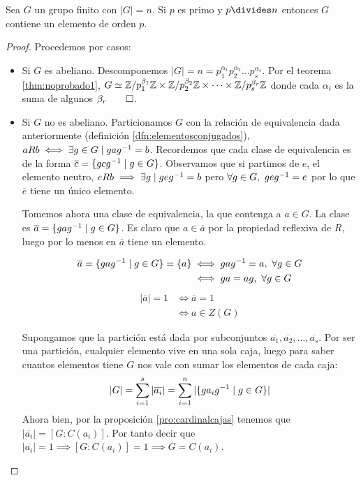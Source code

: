 \begin{thm}[de Cauchy]
	Sea $G$ un grupo finito con $|G| = n$. Si $p$ es primo y $p\divides n$ entonces $G$ contiene un elemento de orden $p$.
\end{thm}

\begin{proof}
	Procedemos por casos:
	\begin{itemize}
		\item Si $G$ es abeliano. Descomponemos $|G| = n = p_1^{\alpha_1}p_2^{\alpha_2}\dots p_s^{\alpha_s}$. Por el teorema \ref{thm:noprobado1}, $G \simeq \mathbb{Z}/p_1^{\beta_1}\mathbb{Z} \times \mathbb{Z}/p_2^{\beta_2}\mathbb{Z} \times \dots \times \mathbb{Z}/p_s^{\beta_r}\mathbb{Z}$ donde cada $\alpha_i$ es la suma de algunos $\beta_r \qed$.
		
		\item Si $G$ no es abeliano. Particionamos $G$ con la relación de equivalencia dada anteriormente (definición \ref{dfn:elementosconjugados}), $aRb \iff \exists g \in G \mid gag^{-1} = b$. Recordemos que cada clase de equivalencia es de la forma $\overline{c} = \{gcg^{-1} \mid g \in G\}$. Observamos que si partimos de $e$, el elemento neutro, $eRb \implies \exists g \mid geg^{-1} = b$ pero $\forall g \in G,\ geg^{-1} = e$ por lo que $\overline{e}$ tiene un único elemento.
		
		Tomemos ahora una clase de equivalencia, la que contenga a $a \in G$. La clase es $\overline{a} = \{gag^{-1} \mid g \in G\}$. Es claro que $a \in \overline{a}$ por la propiedad reflexiva de $R$, luego por lo menos en $\overline{a}$ tiene un elemento.
		
		\begin{align*}
		\overline{a} = \{gag^{-1} \mid g \in G\} = \{a\} &\iff gag^{-1} = a,\ \forall g \in G \\
		&\iff ga = ag,\ \forall g \in G
		\end{align*}
		\begin{align*}
		|\overline{a}| = 1 &\iff \overline{a} = 1 \\
		&\iff a \in Z(G)
		\end{align*}
		
		Supongamos que la partición está dada por subconjuntos $\overline{a_1}, \overline{a_2}, \dots, \overline{a_s}$. Por ser una partición, cualquier elemento vive en una sola caja, luego para saber cuantos elementos tiene $G$ nos vale con sumar los elementos de cada caja:
		\begin{align*}
		|G| = \sum_{i = 1}^{s} |\overline{a_i}| = \sum_{i = 1}^n |\{ga_ig^{-1} \mid g \in G\}|
		\end{align*}
		Ahora bien, por la proposición \ref{pro:cardinalcajas} tenemos que $|\overline{a_i}| = [G:C(a_i)]$. Por tanto decir que $|\overline{a_i}| = 1 \implies [G:C(a_i)] = 1 \implies G = C(a_i)$.
		

\end{itemize}
\end{proof}
